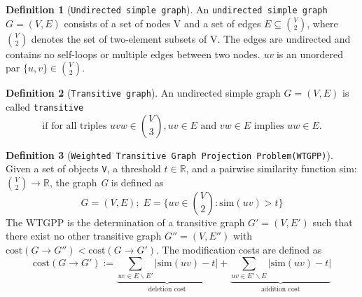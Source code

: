 \documentclass[a4paper,10pt]{article}
\theoremstyle{plain}
\theoremstyle{definition}
\newtheorem{defn}{Definition}
\begin{document}
\begin{defn}[\texttt{Undirected simple graph}]\label{def:Undirected simple graph}
	An \texttt{undirected simple graph} $G = (V, E)$ consists of a set of nodes V and a set of edges $E \subseteq {V \choose 2}$, where ${V \choose 2}$ denotes the set of two-element subsets of V. The edges are undirected and contains no self-loops or multiple edges between two nodes. \textit{uv} is an unordered par $\{u, v \} \in {V \choose 2}$.
\end{defn}

\begin{defn}[\texttt{Transitive graph}]\label{def:Transitive graph}
	An undirected simple graph $G = (V, E)$ is called \texttt{transitive} 
	\begin{equation*}
	\text{if for all triples } uvw \in {V \choose 3}, uv \in E \text{ and } vw \in E \text{ implies } uw \in E.
	\end{equation*}
\end{defn}

\begin{defn}[\texttt{Weighted Transitive Graph Projection Problem(WTGPP)}]\label{def:WTGPP}
	 Given a set of objects \texttt{V}, a threshold $t \in \mathbb{R}$, and a pairwise similarity function sim: ${V \choose 2} \rightarrow \mathbb{R}$, the graph \textit{G} is defined as
	 \begin{equation}\label{eq:sim above threshold}
	 G = (V, E); \; E = \bigg\{ uv \in {V \choose 2} : \text{sim}(uv) > t\bigg\}
	 \end{equation}
	 The WTGPP is the determination of a transitive graph $G' = (V, E')$ such that there exist no other transitive graph $G'' = (V, E'')$ with $\text{cost}(G \rightarrow G'') < \text{cost}(G \rightarrow G')$. The modification costs are defined as
	 \begin{equation}\label{eq:TC cost function}
		 \text{cost}(G \rightarrow G') := \underbrace{\sum_{uv \in E \backslash E'} | \text{sim}(uv) - t |}_{\text{deletion cost}} + \underbrace{\sum_{uv \in E' \backslash E} | \text{sim}(uv) - t |}_{\text{addition cost}}
	 \end{equation}
\end{defn}

\end{document}
